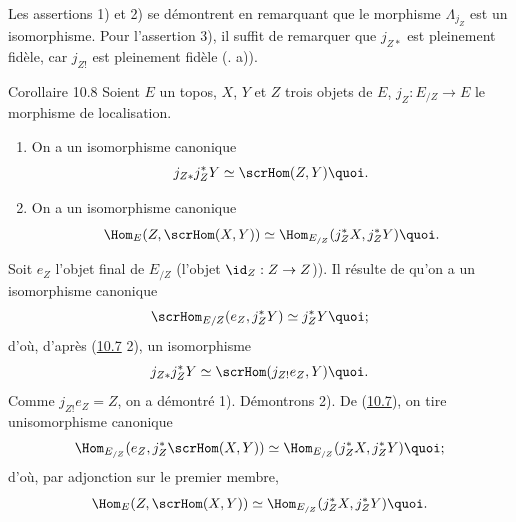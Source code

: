 Les assertions 1) et 2) se démontrent en remarquant que le morphisme
$\Lambda_{j_Z}$ est un isomorphisme. Pour l'assertion 3), il suffit
de remarquer que $j_{Z\ast}$ est pleinement fidèle, car $j_{Z!}$ est
pleinement fidèle (. a)).

\begin{enonce*}{Corollaire 10.8}
Soient $E$ un topos, $X$, $Y$ et $Z$ trois objets de $E$,
$j_Z:E_{/Z}\rightarrow E$ le morphisme de localisation.
\begin{enumerate}
\renewcommand{\labelenumi}{\theenumi)}
\item On a un isomorphisme canonique
$$
j_{Z\ast}j^{\ast}_ZY\simeq \scrHom(Z,Y){\quoi}.
$$

\item On a un isomorphisme canonique
$$
\Hom_E(Z,\scrHom(X,Y))\simeq \Hom_{E_{/Z}}(j^{\ast}_ZX,
j^{\ast}_ZY){\quoi}.
$$
\end{enumerate}
\end{enonce*}

Soit $e_Z$ l'objet final de $E_{/Z}$ (\ie l'objet
$\id_Z:Z\rightarrow Z$)). Il résulte de  qu'on a un
isomorphisme canonique
$$
\scrHom_{E/Z}(e_Z, j^{\ast}_ZY)\simeq j^{\ast}_ZY{\quoi};
$$
d'où, d'après (\hyperref[IV.cor10.7]{10.7} 2), un isomorphisme
$$
j_{Z\ast}j^{\ast}_Z Y\simeq \scrHom(j_{Z!}e_Z, Y){\quoi.}
$$
Comme $j_{Z!}e_Z=Z$, on a démontré 1). Démontrons 2). De
(\hyperref[IV.cor10.7]{10.7}), on tire un\pageoriginale isomorphisme canonique
$$
\Hom_{E_{/Z}}(e_Z, j^{\ast}_Z\scrHom(X,Y))\simeq
\Hom_{E_{/Z}}(j^{\ast}_Z X, j^{\ast}_ZY){\quoi};
$$
d'où, par adjonction sur le premier membre,
$$
\Hom_E(Z,\scrHom(X,Y))\simeq \Hom_{E_{/Z}}(j^{\ast}_ZX,
j^{\ast}_ZY){\quoi}.
$$
